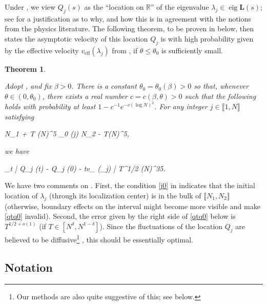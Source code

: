 \documentclass{amsart}
\numberwithin{equation}{section}
\DeclareMathOperator{\eig}{eig}
\DeclareMathOperator{\eff}{eff}
\newtheorem{thm}{Theorem}[section]
\theoremstyle{remark}
\theoremstyle{definition}
\begin{document}
		Under , we view $Q_j (s)$ as the ``location on $\mathbb{R}$'' of the eigenvalue $\lambda_j \in \eig \bm{L} (s)$; see \cite[Sections 1 and 2]{LC} for a justification as to why, and how this is in agreement with the notions from the physics literature. The following theorem, to be proven in  below, then states the asymptotic velocity of this location $Q_j$ is with high probability given by the effective velocity $v_{\eff} (\lambda_j)$ from , if $\theta \le \theta_0$ is sufficiently small.
		
		
	
	\begin{thm}
		\label{vestimate} 
		
		Adopt , and fix $\beta > 0$. There is a constant $\theta_0 = \theta_0 (\beta) > 0$ so that, whenever $\theta \in (0, \theta_0)$, there exists a real number $c = c(\beta, \theta) > 0$ such that the following holds with probability at least $1 - c^{-1} e^{-c(\log N)^2}$. For any integer $j \in \llbracket 1, N \rrbracket$ satisfying 
		\begin{flalign} 
			\label{j0} 
			N_1 + T (\log N)^5 \le \varphi_0 (j) \le N_2 - T(\log N)^5,
		\end{flalign} 
		
		\noindent we have 
		\begin{flalign}
			\label{qtq0} 
			\displaystyle\sup_{t \in [0,T]} \big| Q_j (t) - Q_j (0) - tv_{\eff} (\lambda_j) \big| \le T^{1/2} (\log N)^{35}.
		\end{flalign} 
		
	\end{thm}
	
	
	We have two comments on . First, the condition \eqref{j0} in  indicates that the initial location of $\lambda_j$ (through its localization center) is in the bulk of $\llbracket N_1, N_2 \rrbracket$ (otherwise, boundary effects on the interval might become more visible and make \eqref{qtq0} invalid). Second, the error given by the right side of \eqref{qtq0} below is $T^{1/2+o(1)}$ (if $T \in [N^{\delta}, N^{1-\delta}]$). Since the fluctuations of the location $Q_j$ are believed to be diffusive\footnote{Our methods are also quite suggestive of this; see  below.} \cite{HDIS,HOSQ,HSIMS}, this should be essentially optimal. 
	
	
	
	\subsection{Notation} 
	
\end{document}
